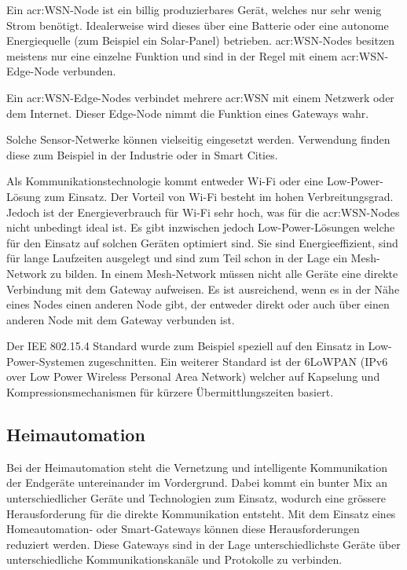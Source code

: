 Ein \gls{acr:WSN}-Node ist ein billig produzierbares Gerät, welches nur sehr wenig Strom benötigt. Idealerweise wird dieses über eine Batterie oder eine autonome Energiequelle (zum Beispiel ein Solar-Panel) betrieben. \gls{acr:WSN}-Nodes besitzen meistens nur eine einzelne Funktion und sind in der Regel mit einem \gls{acr:WSN}-Edge-Node verbunden.

Ein \gls{acr:WSN}-Edge-Nodes verbindet mehrere \gls{acr:WSN} mit einem Netzwerk oder dem Internet. Dieser Edge-Node nimmt die Funktion eines Gateways wahr.

Solche Sensor-Netwerke können vielseitig eingesetzt werden. Verwendung finden diese zum Beispiel in der Industrie oder in Smart Cities.

Als Kommunikationstechnologie kommt entweder Wi-Fi oder eine Low-Power-Lösung zum Einsatz. Der Vorteil von Wi-Fi besteht im hohen Verbreitungsgrad. Jedoch ist der Energieverbrauch für Wi-Fi sehr hoch, was für die \gls{acr:WSN}-Nodes nicht unbedingt ideal ist. Es gibt inzwischen jedoch Low-Power-Lösungen welche für den Einsatz auf solchen Geräten optimiert sind. Sie sind Energieeffizient, sind für lange Laufzeiten ausgelegt und sind zum Teil schon in der Lage ein Mesh-Network zu bilden. In einem Mesh-Network müssen nicht alle Geräte eine direkte Verbindung mit dem Gateway aufweisen. Es ist ausreichend, wenn es in der Nähe eines Nodes einen anderen Node gibt, der entweder direkt oder auch über einen anderen Node mit dem Gateway verbunden ist.

Der IEE 802.15.4 Standard wurde zum Beispiel speziell auf den Einsatz in Low-Power-Systemen zugeschnitten. Ein weiterer Standard ist der 6LoWPAN (IPv6 over Low Power Wireless Personal Area Network) welcher auf Kapselung und Kompressionsmechanismen für kürzere Übermittlungszeiten basiert.


\subsection{Heimautomation} 
Bei der Heimautomation steht die Vernetzung und intelligente Kommunikation der Endgeräte untereinander im Vordergrund. Dabei kommt ein bunter Mix an unterschiedlicher Geräte und Technologien zum Einsatz, wodurch eine grössere Herausforderung für die direkte Kommunikation entsteht. Mit dem Einsatz eines Homeautomation- oder Smart-Gateways können diese Herausforderungen reduziert werden. Diese Gateways sind in der Lage unterschiedlichste Geräte über unterschiedliche Kommunikationskanäle und Protokolle zu verbinden.



